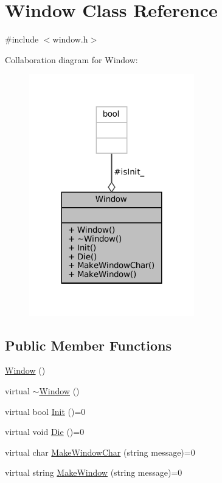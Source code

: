 \hypertarget{classWindow}{}\section{Window Class Reference}
\label{classWindow}


{\ttfamily \#include $<$window.\+h$>$}



Collaboration diagram for Window\+:\nopagebreak
\begin{figure}[H]
\begin{center}
\leavevmode
\includegraphics[width=203pt]{classWindow__coll__graph}
\end{center}
\end{figure}
\subsection*{Public Member Functions}
\begin{DoxyCompactItemize}
\item 
\mbox{\hyperlink{classWindow_a74e6087da23d3c24e9fac0245e5ec92c}{Window}} ()
\item 
virtual \mbox{\hyperlink{classWindow_a62b4a97b3c2e492f1d9a46092011e2d9}{$\sim$\+Window}} ()
\item 
virtual bool \mbox{\hyperlink{classWindow_a91ad1340d4f60465f0e6eef38f0e5fb1}{Init}} ()=0
\item 
virtual void \mbox{\hyperlink{classWindow_a5332552d06a88b58486c0ab803356d01}{Die}} ()=0
\item 
virtual char \mbox{\hyperlink{classWindow_ae770439748fb6b7dcdb3071860e687b3}{Make\+Window\+Char}} (string message)=0
\item 
virtual string \mbox{\hyperlink{classWindow_a3a24c6368cb054a5ca3b32db2558319f}{Make\+Window}} (string message)=0
\end{DoxyCompactItemize}
